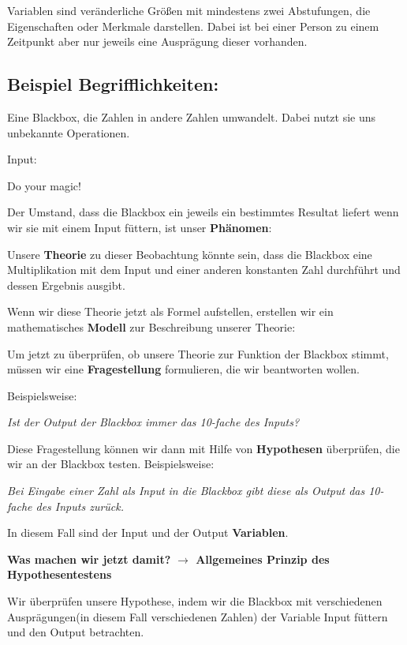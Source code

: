 \documentclass[
]{book}
\begin{document}
Variablen sind veränderliche Größen mit mindestens zwei Abstufungen, die Eigenschaften oder Merkmale darstellen. Dabei ist bei einer Person zu einem Zeitpunkt aber nur jeweils eine Ausprägung dieser vorhanden.

\hypertarget{beispiel-begrifflichkeiten}{%
\subsection{Beispiel Begrifflichkeiten:}\label{beispiel-begrifflichkeiten}}

Eine Blackbox, die Zahlen in andere Zahlen umwandelt. Dabei nutzt sie uns unbekannte Operationen.

Input:

\hypertarget{input}{}

\hypertarget{blackux20box}{}

Do your magic!

Der Umstand, dass die Blackbox ein jeweils ein bestimmtes Resultat liefert wenn wir sie mit einem Input füttern, ist unser \textbf{Phänomen}:

Unsere \textbf{Theorie} zu dieser Beobachtung könnte sein, dass die Blackbox eine Multiplikation mit dem Input und einer anderen konstanten Zahl durchführt und dessen Ergebnis ausgibt.

Wenn wir diese Theorie jetzt als Formel aufstellen, erstellen wir ein mathematisches \textbf{Modell} zur Beschreibung unserer Theorie:

Um jetzt zu überprüfen, ob unsere Theorie zur Funktion der Blackbox stimmt, müssen wir eine \textbf{Fragestellung} formulieren, die wir beantworten wollen.

Beispielsweise:

\emph{Ist der Output der Blackbox immer das 10-fache des Inputs?}

Diese Fragestellung können wir dann mit Hilfe von \textbf{Hypothesen} überprüfen, die wir an der Blackbox testen. Beispielsweise:

\emph{Bei Eingabe einer Zahl als Input in die Blackbox gibt diese als Output das 10-fache des Inputs zurück.}

In diesem Fall sind der Input und der Output \textbf{Variablen}.

\textbf{Was machen wir jetzt damit?}
\textbf{\(\rightarrow\) Allgemeines Prinzip des Hypothesentestens}

Wir überprüfen unsere Hypothese, indem wir die Blackbox mit verschiedenen Ausprägungen(in diesem Fall verschiedenen Zahlen) der Variable Input füttern und den Output betrachten.
\end{document}
